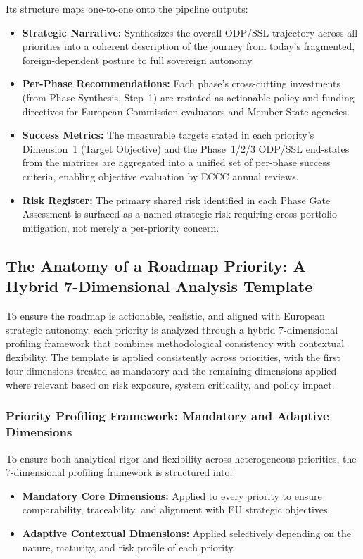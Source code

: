 \documentclass{ieeeaccess}
\begin{document}
Its structure maps one-to-one onto the pipeline outputs:
\begin{itemize}
    \item \textbf{Strategic Narrative:} Synthesizes the overall ODP/SSL
    trajectory across all priorities into a coherent description of the
    journey from today's fragmented, foreign-dependent posture to full
    sovereign autonomy.
    \item \textbf{Per-Phase Recommendations:} Each phase's
    cross-cutting investments (from Phase Synthesis, Step~1) are restated
    as actionable policy and funding directives for European Commission
    evaluators and Member State agencies.
    \item \textbf{Success Metrics:} The measurable targets stated in
    each priority's Dimension~1 (Target Objective) and the Phase~1/2/3
    ODP/SSL end-states from the matrices are aggregated into a unified set
    of per-phase success criteria, enabling objective evaluation by ECCC
    annual reviews.
    \item \textbf{Risk Register:} The primary shared risk identified in each
    Phase Gate Assessment is surfaced as a named strategic risk requiring
    cross-portfolio mitigation, not merely a per-priority concern.
\end{itemize}

\subsection{The Anatomy of a Roadmap Priority: A Hybrid 7-Dimensional Analysis Template}

To ensure the roadmap is actionable, realistic, and aligned with European strategic autonomy, each priority is analyzed through a hybrid 7-dimensional profiling framework that combines methodological consistency with contextual flexibility. The template is applied consistently across priorities, with the first four dimensions treated as mandatory and the remaining dimensions applied where relevant based on risk exposure, system criticality, and policy impact.

\subsubsection*{Priority Profiling Framework: Mandatory and Adaptive Dimensions}
To ensure both analytical rigor and flexibility across heterogeneous priorities, the 7-dimensional profiling framework is structured into:

\begin{itemize}
    \item \textbf{Mandatory Core Dimensions:} Applied to every priority to ensure comparability, traceability, and alignment with EU strategic objectives.
    \item \textbf{Adaptive Contextual Dimensions:} Applied selectively depending on the nature, maturity, and risk profile of each priority.
\end{itemize}
\end{document}

